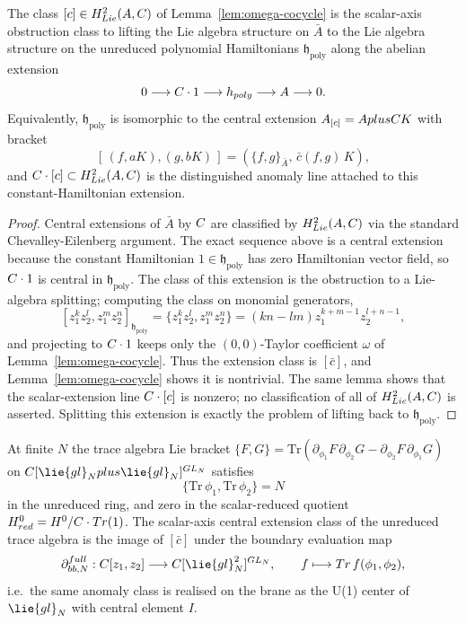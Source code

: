\documentclass[11pt]{memoir}
\begin{document}
\begin{thm}\label{thm:u1-center-anomaly}
  The class $[c]\in H^2_{Lie}(A,C)$ of
  Lemma~\ref{lem:omega-cocycle} is the scalar-axis obstruction class to lifting
  the Lie algebra structure on $\bar A$ to the Lie algebra structure on the
  unreduced polynomial Hamiltonians $\mathfrak h_{\mathrm{poly}}$ along the
  abelian extension
  $$0\longrightarrow C\cdot 1\longrightarrow h_{poly}
    \longrightarrow A\longrightarrow 0.$$
  Equivalently, $\mathfrak h_{\mathrm{poly}}$ is isomorphic to the central
  extension $A_{[c]}=AplusC K$ with bracket
  $$[\,(f,aK),(g,bK)\,]=(\{f,g\}_{\bar A},\,\bar c(f,g)\,K),$$
  and $C\cdot[c]\subset H^2_{Lie}(A,C)$ is the
  distinguished anomaly line attached to this constant-Hamiltonian
  extension.
\end{thm}

\begin{proof}
  Central extensions of $\bar A$ by $C$ are classified by
  $H^2_{Lie}(A,C)$ via the standard Chevalley-Eilenberg
  argument. The exact sequence above is a central extension because the
  constant Hamiltonian $1\in\mathfrak h_{\mathrm{poly}}$ has zero Hamiltonian
  vector field, so $C\cdot 1$ is central in
  $\mathfrak h_{\mathrm{poly}}$. The class of this extension is the obstruction
  to a Lie-algebra splitting; computing the class on monomial generators,
  $$[z_1^kz_2^l,z_1^mz_2^n]_{\mathfrak h_{\mathrm{poly}}}
    =\{z_1^kz_2^l,z_1^mz_2^n\}=
    (kn-lm)z_1^{k+m-1}z_2^{l+n-1},$$
  and projecting to $C\cdot 1$ keeps only the $(0,0)$-Taylor coefficient
  $\omega$ of Lemma~\ref{lem:omega-cocycle}. Thus the extension class is
  $[\bar c]$, and Lemma~\ref{lem:omega-cocycle} shows it is nontrivial. The
  same lemma shows that the scalar-extension line $C\cdot[c]$ is
  nonzero; no classification of all of
  $H^2_{Lie}(A,C)$ is asserted. Splitting this extension
  is exactly the problem of lifting back to $\mathfrak h_{\mathrm{poly}}$.
\end{proof}

\begin{thm}\label{thm:u1-center-anomaly-open}
  At finite $N$ the trace algebra Lie bracket
  $\{F,G\}=\mathrm{Tr}(\partial_{\phi_1}F\,\partial_{\phi_2}G
  -\partial_{\phi_2}F\,\partial_{\phi_1}G)$ on
  $\C[\lie{gl}_N\oplus\lie{gl}_N]^{GL_N}$ satisfies
  $$\{\mathrm{Tr}\,\phi_1,\mathrm{Tr}\,\phi_2\}=N$$
  in the unreduced ring, and zero in the scalar-reduced quotient
  $H^0_{red}=H^0/C\cdot Tr(1)$. The scalar-axis central
  extension class of the unreduced trace algebra is the
  image of $[\bar c]$ under the boundary evaluation map
  $$\partial_{\mathrm{bb},N}^{\mathrm{full}}:\C[z_1,z_2]\longrightarrow
    \C[\lie{gl}_N^2]^{GL_N},\qquad
    f\longmapsto \mathrm{Tr}\,f(\phi_1,\phi_2),$$
  i.e.\ the same anomaly class is realised on the brane as the U(1) center
  of $\lie{gl}_N$ with central element $I$.
\end{thm}
\end{document}
